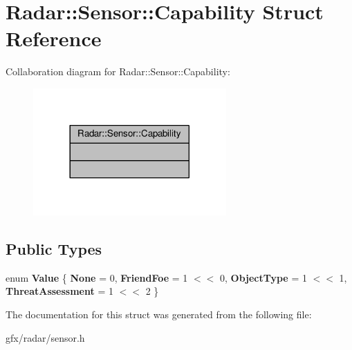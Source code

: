 \hypertarget{structRadar_1_1Sensor_1_1Capability}{}\section{Radar\+:\+:Sensor\+:\+:Capability Struct Reference}
\label{structRadar_1_1Sensor_1_1Capability}


Collaboration diagram for Radar\+:\+:Sensor\+:\+:Capability\+:
\nopagebreak
\begin{figure}[H]
\begin{center}
\leavevmode
\includegraphics[width=209pt]{de/df4/structRadar_1_1Sensor_1_1Capability__coll__graph}
\end{center}
\end{figure}
\subsection*{Public Types}
\begin{DoxyCompactItemize}
\item 
enum {\bfseries Value} \{ {\bfseries None} = 0, 
{\bfseries Friend\+Foe} = 1 $<$$<$ 0, 
{\bfseries Object\+Type} = 1 $<$$<$ 1, 
{\bfseries Threat\+Assessment} = 1 $<$$<$ 2
 \}\hypertarget{structRadar_1_1Sensor_1_1Capability_a00609291d72be945fd88d4ceaacb1a25}{}\label{structRadar_1_1Sensor_1_1Capability_a00609291d72be945fd88d4ceaacb1a25}

\end{DoxyCompactItemize}


The documentation for this struct was generated from the following file\+:\begin{DoxyCompactItemize}
\item 
gfx/radar/sensor.\+h\end{DoxyCompactItemize}
